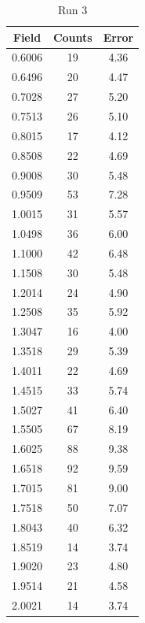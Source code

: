 \begin{table}
\caption{Run 3}
\begin{tabular}{|c|c|c|} \hline
Field	&	Counts	&	Error	\\ \hline
0.6006	&	19	&	4.36	\\ \hline
0.6496	&	20	&	4.47	\\ \hline
0.7028	&	27	&	5.20	\\ \hline
0.7513	&	26	&	5.10	\\ \hline
0.8015	&	17	&	4.12	\\ \hline
0.8508	&	22	&	4.69	\\ \hline
0.9008	&	30	&	5.48	\\ \hline
0.9509	&	53	&	7.28	\\ \hline
1.0015	&	31	&	5.57	\\ \hline
1.0498	&	36	&	6.00	\\ \hline
1.1000	&	42	&	6.48	\\ \hline
1.1508	&	30	&	5.48	\\ \hline
1.2014	&	24	&	4.90	\\ \hline
1.2508	&	35	&	5.92	\\ \hline
1.3047	&	16	&	4.00	\\ \hline
1.3518	&	29	&	5.39	\\ \hline
1.4011	&	22	&	4.69	\\ \hline
1.4515	&	33	&	5.74	\\ \hline
1.5027	&	41	&	6.40	\\ \hline
1.5505	&	67	&	8.19	\\ \hline
1.6025	&	88	&	9.38	\\ \hline
1.6518	&	92	&	9.59	\\ \hline
1.7015	&	81	&	9.00	\\ \hline
1.7518	&	50	&	7.07	\\ \hline
1.8043	&	40	&	6.32	\\ \hline
1.8519	&	14	&	3.74	\\ \hline
1.9020	&	23	&	4.80	\\ \hline
1.9514	&	21	&	4.58	\\ \hline
2.0021	&	14	&	3.74	\\ \hline
\end{tabular}
\end{table}
